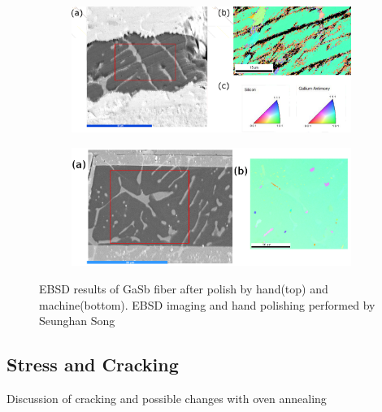 \begin{figure}[h]
\centering
\begin{subfigure}{\textwidth}
  \centering
  \includegraphics[width=\linewidth]{fig/Results/gasb.png}
  \label{fig:sfig1}
\end{subfigure}%

\begin{subfigure}{\textwidth}
  \centering
  \includegraphics[width=\linewidth]{fig/ebsd_machinepolish.png}
  \label{fig:sfig2}
\end{subfigure}%

\caption{EBSD results of GaSb fiber after polish by hand(top) and machine(bottom). EBSD imaging and hand polishing performed by Seunghan Song}
\label{fig:ebsd}
\end{figure}

\FloatBarrier
\subsection{Stress and Cracking}
Discussion of cracking and possible changes with oven annealing


